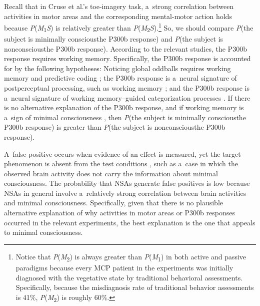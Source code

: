 Recall that in Cruse et al.'s
\parencite*[][]{cruse_bedside_2011} %
 toe-imagery task, a~strong correlation between activities in motor areas and the corresponding mental-motor action holds because \textit{P}(\textit{M}\textsubscript{1}{\textbar}\textit{S}) is relatively greater than \textit{P}(\textit{M}\textsubscript{2}{\textbar}\textit{S}).\footnote{ Notice that \textit{P}(\textit{M}\textsubscript{2}) is always greater than \textit{P}(\textit{M}\textsubscript{1}) in both active and passive paradigms because every MCP patient in the experiments was initially diagnosed with the vegetative state by traditional behavioral assessments. Specifically, because the misdiagnosis rate of traditional behavior assessments is 41\%, \textit{P}(\textit{M}\textsubscript{2}) is roughly 60\%.} So, we should compare \textit{P}(the subject is minimally conscious{\textbar}the P300b response) and \textit{P}(the subject is nonconscious{\textbar}the P300b response). According to the relevant studies, the P300b response requires working memory. Specifically, the P300b response is accounted for by the following hypotheses: Noticing global oddballs requires working memory and predictive coding 
\parencites*[][]{garrido_functional_2008}[][]{schnakers_diagnostic_2009}; %
 the P300b response is a~neural signature of postperceptual processing, such as working memory 
\parencite[][]{cohen_distinguishing_2020}; %
 and the P300b response is a~neural signature of working memory–guided categorization processes 
\parencite[][]{rac-lubashevsky_revisiting_2019}. %
 If there is no alternative explanation of the P300b response, and if working memory is a~sign of minimal consciousness 
\parencites[][]{ansell_slow--recover_1993}[][]{bekinschtein_neural_2009}[][]{king_single-trial_2013}, %
 then \textit{P}(the subject is minimally conscious{\textbar}the P300b response) is greater than \textit{P}(the subject is nonconscious{\textbar}the P300b response).

A~false positive occurs when evidence of an effect is measured, yet the target phenomenon is absent from the test conditions
\parencite[][p.591]{peterson_risk_2015}, %
 such as a~case in which the observed brain activity does not carry the information about minimal consciousness. The probability that NSAs generate false positives is low because NSAs in general involve a~relatively strong correlation between brain activities and minimal consciousness. Specifically, given that there is no plausible alternative explanation of why activities in motor areas or P300b responses occurred in the relevant experiments, the best explanation is the one that appeals to minimal consciousness.

